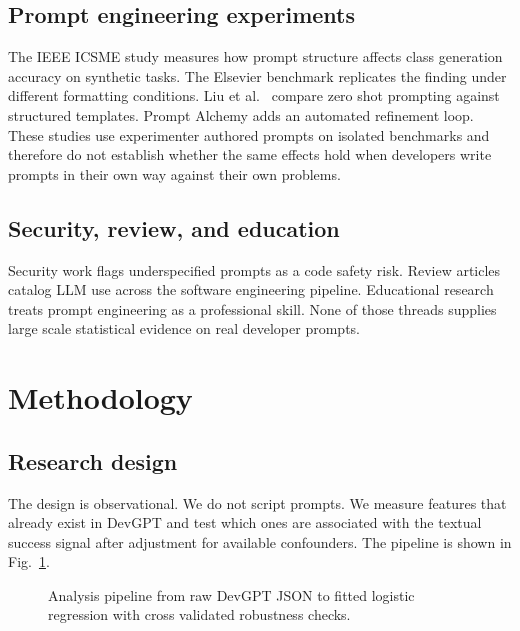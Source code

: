 \documentclass[conference]{IEEEtran}
\begin{document}
\subsection{Prompt engineering experiments}
The IEEE ICSME study \cite{icsme2025prompting} measures how prompt structure affects class generation accuracy on synthetic tasks. The Elsevier benchmark \cite{elsevier2025promptengineering} replicates the finding under different formatting conditions. Liu et al.\ \cite{liu2023improvingchatgpt} compare zero shot prompting against structured templates. Prompt Alchemy \cite{ye2025promptalchemy} adds an automated refinement loop. These studies use experimenter authored prompts on isolated benchmarks and therefore do not establish whether the same effects hold when developers write prompts in their own way against their own problems.

\subsection{Security, review, and education}
Security work \cite{secure2024prompting} flags underspecified prompts as a code safety risk. Review articles \cite{sn2025codereview} catalog LLM use across the software engineering pipeline. Educational research \cite{frontiers2024education} treats prompt engineering as a professional skill. None of those threads supplies large scale statistical evidence on real developer prompts.

\section{Methodology}\label{sec:method}
\subsection{Research design}
The design is observational. We do not script prompts. We measure features that already exist in DevGPT and test which ones are associated with the textual success signal after adjustment for available confounders. The pipeline is shown in Fig.~\ref{fig:pipeline}.

\begin{figure}[t]
\centering
{}
\caption{Analysis pipeline from raw DevGPT JSON to fitted logistic regression with cross validated robustness checks.}
\label{fig:pipeline}
\end{figure}
\end{document}
